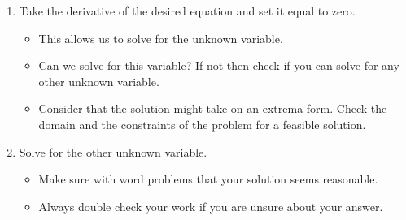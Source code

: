 \documentclass[12pt]{article}
\begin{document}
\begin{enumerate}
      \item Take the derivative of the desired equation and set it equal to zero.
      \begin{itemize}
        \item This allows us to solve for the unknown variable.
        \item Can we solve for this variable? If not then check if you can solve for any other unknown variable.
        \item Consider that the solution might take on an extrema form. Check the domain and the constraints of the problem for a feasible solution.
      \end {itemize}
      \item Solve for the other unknown variable.
      \begin{itemize}
        \item Make sure with word problems that your solution seems reasonable.
        \item Always double check your work if you are unsure about your answer.
      \end{itemize}
    \end{enumerate}
\end{document}

